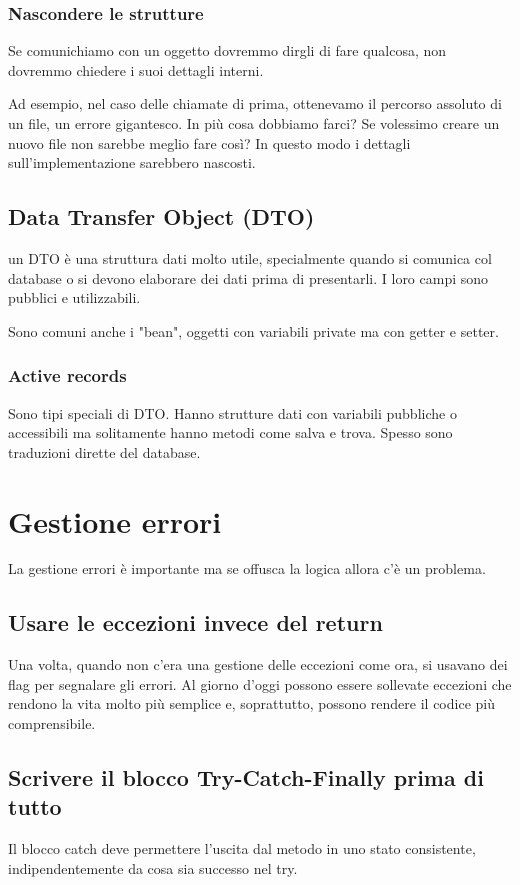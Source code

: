 \documentclass[11pt,a4paper]{book}
\begin{document}
\subsection{Nascondere le strutture}
Se comunichiamo con un oggetto dovremmo dirgli di fare qualcosa, non dovremmo chiedere i suoi dettagli interni.

Ad esempio, nel caso delle chiamate di prima, ottenevamo il percorso assoluto di un file, un errore gigantesco. In più cosa dobbiamo farci? Se volessimo creare un nuovo file non sarebbe meglio fare così?
\label{code: 042}
In questo modo i dettagli sull'implementazione sarebbero nascosti.

\section{Data Transfer Object (DTO)}
un DTO è una struttura dati molto utile, specialmente quando si comunica col database o si devono elaborare dei dati prima di presentarli. I loro campi sono pubblici e utilizzabili.

Sono comuni anche i "bean", oggetti con variabili private ma con getter e setter.
\label{code: 043}

\subsection{Active records}
Sono tipi speciali di DTO. Hanno strutture dati con variabili pubbliche o accessibili ma solitamente hanno metodi come salva e trova. Spesso sono traduzioni dirette del database.

\chapter{Gestione errori}
La gestione errori è importante ma se offusca la logica allora c'è un problema.

\section{Usare le eccezioni invece del return}
Una volta, quando non c'era una gestione delle eccezioni come ora, si usavano dei flag per segnalare gli errori. Al giorno d'oggi possono essere sollevate eccezioni che rendono la vita molto più semplice e, soprattutto, possono rendere il codice più comprensibile.

\section{Scrivere il blocco Try-Catch-Finally prima di tutto}
Il blocco catch deve permettere l'uscita dal metodo in uno stato consistente, indipendentemente da cosa sia successo nel try.
\end{document}
